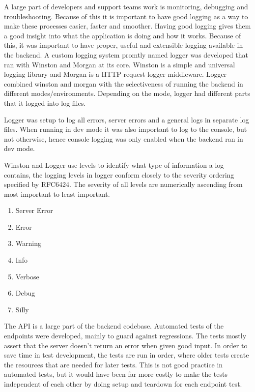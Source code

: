 A large part of developers and support teams work is monitoring, debugging and troubleshooting. Because of this it is important to have good logging as a way to make these processes easier, faster and smoother. Having good logging gives them a good insight into what the application is doing and how it works. Because of this, it was important to have proper, useful and extensible logging available in the backend. A custom logging system promtly named logger was developed that ran with Winston and Morgan at its core. Winston is a simple and universal logging library and Morgan is a HTTP request logger middleware. Logger combined winston and morgan with the selectiveness of running the backend in different modes/environments. Depending on the mode, logger had different parts that it logged into log files.

Logger was setup to log all errors, server errors and a general logs in separate log files. When running in dev mode it was also important to log to the console, but not otherwise, hence console logging was only enabled when the backend ran in dev mode. 

Winston and Logger use levels to identify what type of information a log contains, the logging levels in logger conform closely to the severity ordering specified by RFC6424.
The severity of all levels are numerically ascending from most important to least important.

\begin{enumerate}
  \item Server Error
  \item Error
  \item Warning
  \item Info
  \item Verbose
  \item Debug
  \item Silly
\end{enumerate}

The API is a large part of the backend codebase. Automated tests of the endpoints were developed, mainly to guard against regressions. The tests mostly assert that the server doesn't return an error when given good input. In order to save time in test development, the tests are run in order, where older tests create the resources that are needed for later tests. This is not good practice in automated tests, but it would have been far more costly to make the tests independent of each other by doing setup and teardown for each endpoint test.
